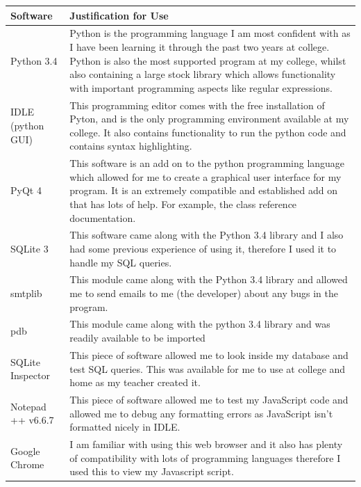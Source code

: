 \begin{center}
\begin{tabular}{|p{3.5cm}|p{8cm}|} \hline
\textbf{Software} & \textbf{Justification for Use} \\ \hline
Python 3.4 & Python is the programming language I am most confident with as I have been learning it through the past two years at college. Python is also the most supported program at my college, whilst also containing a large stock library which allows functionality with important programming aspects like regular expressions.  \\ \hline
IDLE (python GUI) & This programming editor comes with the free installation of Pyton, and is the only programming environment available at my college. It also contains functionality to run the python code and contains syntax highlighting. \\ \hline
PyQt 4 & This software is an add on to the python programming language which allowed for me to create a graphical user interface for my program. It is an extremely compatible and established add on that has lots of help. For example, the class reference documentation. \\ \hline
SQLite 3 & This software came along with the Python 3.4 library and I also had some previous experience of using it, therefore I used it to handle my SQL queries. \\ \hline
smtplib & This module came along with the Python 3.4 library and allowed me to send emails to me (the developer) about any bugs in the program. \\ \hline
pdb & This module came along with the python 3.4 library and was readily available to be imported \\ \hline
SQLite Inspector & This piece of software allowed me to look inside my database and test SQL queries. This was available for me to use at college and home as my teacher created it. \\ \hline
Notepad ++ v6.6.7 & This piece of software allowed me to test my JavaScript code and allowed me to debug any formatting errors as JavaScript isn't formatted nicely in IDLE. \\ \hline
Google Chrome & I am familiar with using this web browser and it also has plenty of compatibility with lots of programming languages therefore I used this to view my Javascript script. \\ \hline

\end{tabular}
\label{tab:Software Justification}
\end{center}


